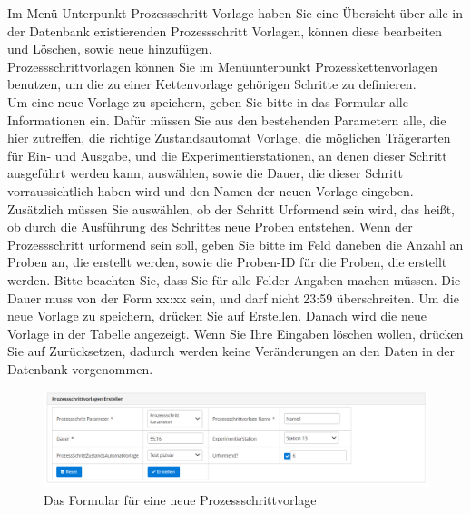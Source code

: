 \documentclass[enabledeprecatedfontcommands,fontsize=12pt,paper=a4,twoside]{scrartcl}
\begin{document}
Im Menü-Unterpunkt Prozessschritt Vorlage haben Sie eine Übersicht über alle in der Datenbank existierenden Prozessschritt Vorlagen, können diese bearbeiten und Löschen, sowie neue hinzufügen. \\

Prozessschrittvorlagen können Sie im Menüunterpunkt Prozesskettenvorlagen benutzen, um die zu einer Kettenvorlage gehörigen Schritte zu definieren. \\

Um eine neue Vorlage zu speichern, geben Sie bitte in das Formular alle Informationen ein. Dafür müssen Sie aus den bestehenden Parametern alle, die hier zutreffen, die richtige Zustandsautomat Vorlage, die möglichen Trägerarten für Ein- und Ausgabe, und die Experimentierstationen, an denen dieser Schritt ausgeführt werden kann, auswählen, sowie die Dauer, die dieser Schritt vorraussichtlich haben wird und den Namen der neuen Vorlage eingeben. Zusätzlich müssen Sie auswählen, ob der Schritt Urformend sein wird, das heißt, ob durch die Ausführung des Schrittes neue Proben entstehen. Wenn der Prozessschritt urformend sein soll, geben Sie bitte im Feld daneben die Anzahl an Proben an, die erstellt werden, sowie die Proben-ID für die Proben, die erstellt werden. Bitte beachten Sie, dass Sie für alle Felder Angaben machen müssen. Die Dauer muss von der Form xx:xx sein, und darf nicht 23:59 überschreiten. Um die neue Vorlage zu speichern, drücken Sie auf Erstellen. Danach wird die neue Vorlage in der Tabelle angezeigt. Wenn Sie Ihre Eingaben löschen wollen, drücken Sie auf Zurücksetzen, dadurch werden keine Veränderungen an den Daten in der Datenbank vorgenommen. \\

\begin{figure}[h!]
\begin{center}
 \includegraphics[width=\textwidth]{screenshots/pk/prozessschrittvorlageformular.png}
  \caption{Das Formular für eine neue Prozessschrittvorlage}
  \label{fig:boat2}
\end{center}
\end{figure}
\end{document}
